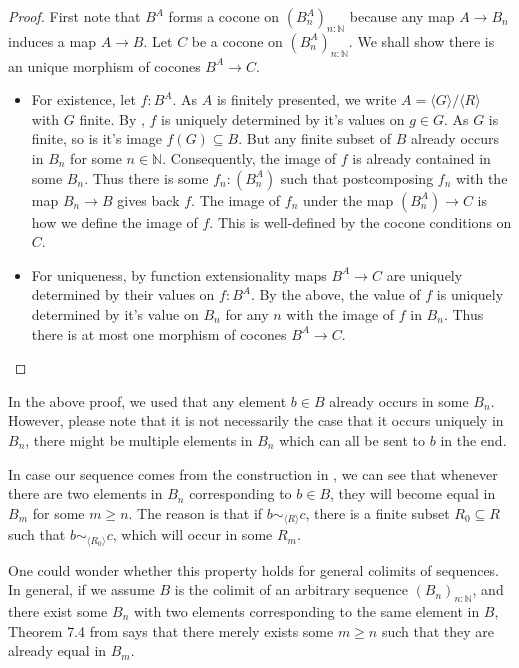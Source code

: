 \begin{proof}
  First note that $B^A$ forms a cocone on $(B_n^A)_{n:\mathbb N}$ 
  because any map $A \to B_n$ induces a map $A \to B$. 
  Let $C$ be a cocone on $(B_n^A)_{n:\mathbb N}$. 
  We shall show there is an unique morphism of cocones $B^A \to C$. 
  \begin{itemize}
    \item For existence, let $f:B^A$. 
      As $A$ is finitely presented, we write $A = \langle G \rangle / \langle R \rangle$ with $G$ finite.
      By , $f$ is uniquely determined by it's values on $g\in G$. 
      As $G$ is finite, so is it's image $f(G)\subseteq B$. 
      But any finite subset of $B$ already occurs in $B_n$ for some $n\in\mathbb N$. 
      Consequently, the image of $f$ is already contained in some $B_n$. 
      Thus there is some $f_n:(B_n^A)$ such that postcomposing 
      $f_n$ with the map $B_n \to B$ gives back $f$. 
      The image of $f_n$ under the map $(B_n^A) \to C$ is how we define the image of $f$. 
      This is well-defined by the cocone conditions on $C$. 
    \item 
      For uniqueness, by function extensionality maps $B^A \to C$ are uniquely determined by their values on 
      $f:B^A$. By the above, the value of $f$ is uniquely determined by it's value on $B_n$ for 
      any $n$ with the image of $f$ in $B_n$. Thus there is at most one morphism of cocones $B^A \to C$. 
  \end{itemize}
\end{proof}
\begin{remark}\label{rmkEqualityColimit}
  In the above proof, we used that any element $b\in B$ already occurs in some $B_n$. 
  However, please note that it is not necessarily the case that it occurs uniquely in $B_n$, 
  there might be multiple elements in $B_n$ which can all be sent to $b$ in the end. 

  In case our sequence comes from the construction in , 
  we can see that whenever there are two elements in 
  $B_n$ corresponding to $b\in B$, they will become equal in $B_m$ for some $m\geq n$. 
  The reason is that if $b \sim_{\langle R \rangle} c$, there is a finite subset $R_0 \subseteq R$ such that 
  $b\sim_{\langle R_0 \rangle} c$, which will occur in some $R_m$. 

  One could wonder whether this property holds for general colimits of sequences. 
  In general, if we assume $B$ is the colimit of an arbitrary sequence $(B_n)_{n:\mathbb N}$, 
  and there exist some $B_n$ with two elements corresponding to the same element in $B$, 
  Theorem 7.4 from \cite{SequentialColimitHoTT} says that there merely exists some $m\geq n$
  such that they are already equal in $B_m$. 
\end{remark}

